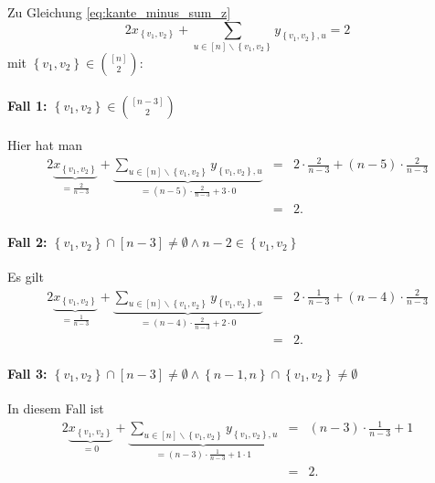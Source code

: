 \documentclass[10p,a4paper,BCOR = 12mm, DIV=15]{scrbook}
\begin{document}
{\begin{bew}
Zu Gleichung \eqref{eq:kante_minus_sum_z} 
\begin{displaymath}
2 x_{\left\{v_1, v_2\right\}} + \sum_{u\in[n]\backslash\left\{v_1, v_2\right\}} y_{\left\{v_1, v_2\right\}, u} = 2
\end{displaymath}
mit $\left\{v_1, v_2\right\} \in {\left[n\right] \choose 2}$:

\paragraph{Fall 1: $\left\{v_1, v_2\right\} \in {\left[n-3\right] \choose 2}$} Hier hat man
\begin{eqnarray*}
2 \underbrace{x_{\left\{v_1, v_2\right\}}}_{= \frac{2}{n-3}} + \underbrace{\sum_{u\in[n]\backslash\left\{v_1, v_2\right\}} y_{\left\{v_1, v_2\right\}, u}}_{= \left(n-5\right) \cdot \frac{2}{n-3} + 3\cdot 0} & = & 2\cdot \frac{2}{n-3} + \left(n-5\right) \cdot \frac{2}{n-3} \\
& = & 2.
\end{eqnarray*}

\paragraph{Fall 2: $\left\{v_1, v_2\right\} \cap \left[n-3\right] \neq \emptyset \wedge n-2 \in \left\{v_1, v_2\right\}$} Es gilt
\begin{eqnarray*}
2 \underbrace{x_{\left\{v_1, v_2\right\}}}_{= \frac{1}{n-3}} + \underbrace{\sum_{u\in[n]\backslash\left\{v_1, v_2\right\}} y_{\left\{v_1, v_2\right\}, u}}_{= \left(n-4\right) \cdot \frac{2}{n-3} + 2\cdot 0} & = & 2\cdot \frac{1}{n-3} + \left(n-4\right) \cdot \frac{2}{n-3} \\
& = & 2.
\end{eqnarray*}

\paragraph{Fall 3: $\left\{v_1, v_2\right\} \cap \left[n-3\right] \neq \emptyset \wedge \left\{n-1, n\right\} \cap \left\{v_1, v_2\right\} \neq \emptyset$} In diesem Fall ist
\begin{eqnarray*}
2 \underbrace{x_{\left\{v_1, v_2\right\}}}_{= 0} + \underbrace{\sum_{u\in[n]\backslash\left\{v_1, v_2\right\}} y_{\left\{v_1, v_2\right\}, u}}_{= \left(n-3\right) \cdot \frac{1}{n-3} + 1\cdot 1} & = & \left(n-3\right) \cdot \frac{1}{n-3} + 1 \\
& = & 2.
\end{eqnarray*}


\end{bew}}
\end{document}
